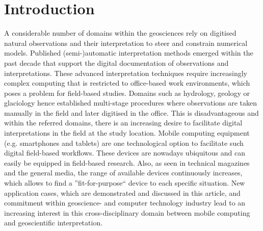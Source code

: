 \documentclass[review]{elsarticle}
\begin{document}
\linenumbers

\section{Introduction}
\label{sec:introduction}

A considerable number of domains within the geosciences rely on digitised natural observations and their interpretation to steer and constrain numerical models. Published (semi-)automatic interpretation methods emerged within the past decade that support the digital documentation of observations and interpretations. These advanced interpretation techniques require increasingly complex computing that is restricted to office-based work environments, which poses a problem for field-based studies. Domains such as hydrology, geology or glaciology hence established multi-stage procedures where observations are taken manually in the field and later digitised in the office. This is disadvantageous and within the referred domains, there is an increasing desire to facilitate digital interpretations in the field at the study location. Mobile computing equipment (e.g. smartphones and tablets) are one technological option to facilitate such digital field-based workflows. These devices are nowadays ubiquitous and can easily be equipped in field-based research. Also, as seen in technical magazines and the general media, the range of available devices continuously increases, which allows to find a ''fit-for-purpose`` device to each specific situation. New application cases, which are demonstrated and discussed in this article, and commitment within geoscience- and computer technology industry lead to an increasing interest in this cross-disciplinary domain between mobile computing and geoscientific interpretation.

\end{document}
